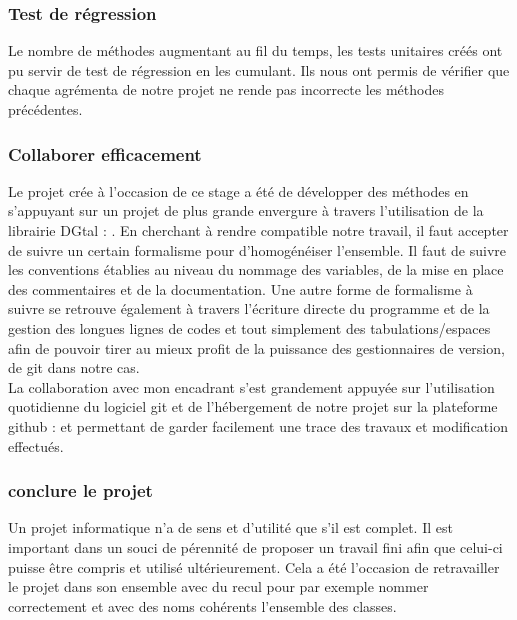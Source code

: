 \subsubsection{Test de régression}

Le nombre de méthodes augmentant au fil du temps, les tests unitaires créés ont pu servir de test de régression en les cumulant. Ils nous ont permis de vérifier que chaque agrémenta de notre projet ne rende pas incorrecte les méthodes précédentes.\\


\subsubsection{Collaborer efficacement}

Le projet crée à l'occasion de ce stage a été de développer des méthodes en s'appuyant sur un projet de plus grande envergure à travers l'utilisation de la librairie DGtal : \cite{DGtal}. En cherchant à rendre compatible notre travail, il faut accepter de suivre un certain formalisme pour d'homogénéiser l'ensemble. Il faut de suivre les conventions établies au niveau du nommage des variables, de la mise en place des commentaires et de la documentation. Une autre forme de formalisme à suivre se retrouve également à travers l'écriture directe du programme et de la gestion des longues lignes de codes et tout simplement des tabulations/espaces afin de pouvoir tirer au mieux profit de la puissance des gestionnaires de version, de git dans notre cas.\\

La collaboration avec mon encadrant s'est grandement appuyée sur l'utilisation quotidienne du logiciel git et de l’hébergement de notre projet sur la plateforme github : \cite{github-tristan} et \cite{github-thomas} permettant de garder facilement une trace des travaux et modification effectués.

\subsubsection{conclure le projet}

Un projet informatique n'a de sens et d'utilité que s'il est complet. Il est important dans un souci de pérennité de proposer un travail fini afin que celui-ci puisse être compris et utilisé ultérieurement. Cela a été l’occasion de retravailler le projet dans son ensemble avec du recul pour par exemple nommer correctement et avec des noms cohérents l'ensemble des classes.





